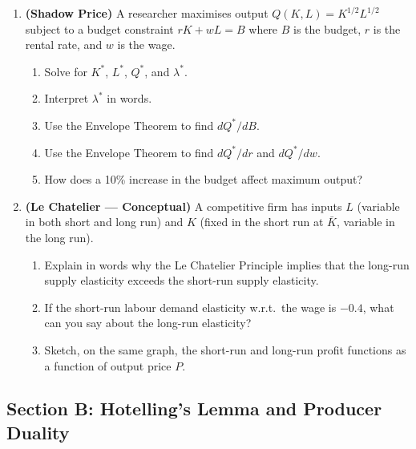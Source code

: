 \documentclass[12pt, a4paper]{article}
\theoremstyle{definition}
\begin{document}
\begin{enumerate}[label=\textbf{A\arabic*.}, leftmargin=2.5em]
\item \textbf{(Shadow Price)}
A researcher maximises output $Q(K,L) = K^{1/2}L^{1/2}$ subject to a budget
constraint $rK + wL = B$ where $B$ is the budget, $r$ is the rental rate, and
$w$ is the wage.
\begin{enumerate}[label=(\alph*)]
  \item Solve for $K^*$, $L^*$, $Q^*$, and $\lambda^*$.
  \item Interpret $\lambda^*$ in words.
  \item Use the Envelope Theorem to find $dQ^*/dB$.
  \item Use the Envelope Theorem to find $dQ^*/dr$ and $dQ^*/dw$.
  \item How does a 10\% increase in the budget affect maximum output?
\end{enumerate}

\item \textbf{(Le Chatelier --- Conceptual)}
A competitive firm has inputs $L$ (variable in both short and long run) and
$K$ (fixed in the short run at $\bar K$, variable in the long run).
\begin{enumerate}[label=(\alph*)]
  \item Explain in words why the Le Chatelier Principle implies that the
        long-run supply elasticity exceeds the short-run supply elasticity.
  \item If the short-run labour demand elasticity w.r.t.\ the wage is
        $-0.4$, what can you say about the long-run elasticity?
  \item Sketch, on the same graph, the short-run and long-run profit
        functions as a function of output price $P$.
\end{enumerate}

\end{enumerate}

\subsection{Section B: Hotelling's Lemma and Producer Duality}
\end{document}

